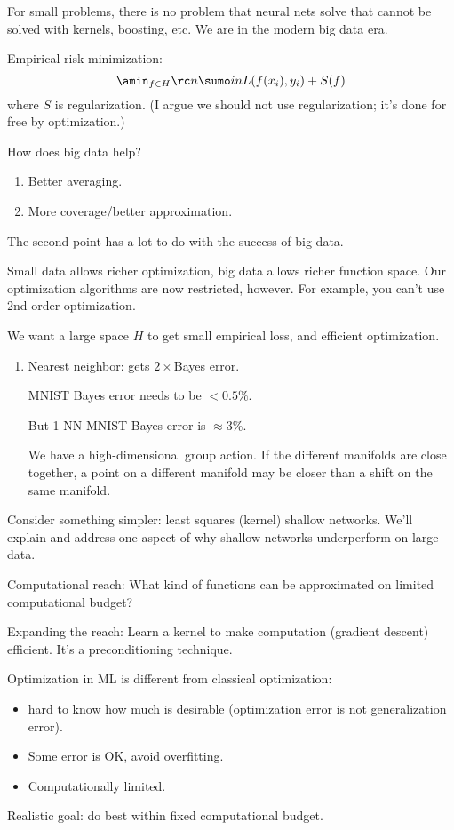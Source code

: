 For small problems, there is no problem that neural nets solve that cannot be solved with kernels, boosting, etc. 
We are in the modern big data era. 

Empirical risk minimization:
$$
\amin_{f\in H} \rc n\sumo in L(f(x_i),y_i) + S(f)
$$
where $S$ is regularization. (I argue we should not use regularization; it's done for free by optimization.)

How does big data help?
\begin{enumerate}
\item
Better averaging.
\item
More coverage/better approximation.
\end{enumerate}
The second point has a lot to do with the success of big data.

Small data allows richer optimization, big data allows richer function space. Our optimization algorithms are now restricted, however. For example, you can't use 2nd order optimization.

We want a large space $H$ to get small empirical loss, and efficient optimization.
\begin{enumerate}
\item

Nearest neighbor: gets $2\times$Bayes error.

MNIST Bayes error needs to be $<0.5\%$.

But 1-NN MNIST Bayes error is $\approx3\%$.

We have a high-dimensional group action.  If the different manifolds are close together, a point on a different manifold may be closer than a shift on the same manifold.
\end{enumerate}

Consider something simpler: least squares (kernel) shallow networks. We'll explain and address one aspect of why shallow networks underperform on large data.

Computational reach: What kind of functions can be approximated on limited computational budget?

Expanding the reach: Learn a kernel to make computation (gradient descent) efficient. It's a preconditioning technique.

Optimization in ML is different from classical optimization:
\begin{itemize}
\item
hard to know how much is desirable (optimization error is not generalization error).
\item
Some error is OK, avoid overfitting.
\item
Computationally limited.
\end{itemize}
Realistic goal: do best within fixed computational budget.

